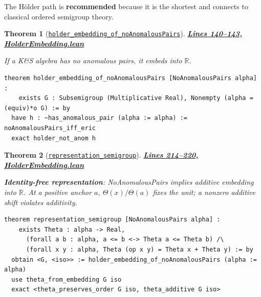 \documentclass[11pt]{article}
\newtheorem{theorem}{Theorem}[section]
\theoremstyle{definition}
\theoremstyle{remark}
\begin{document}
The Hölder path is \textbf{recommended} because it is the shortest and connects to classical
ordered semigroup theory.

\begin{theorem}[\href{https://github.com/zariuq/ks-foundations-of-inference/blob/main/KnuthSkilling/Additive/Proofs/OrderedSemigroupEmbedding/HolderEmbedding.lean\#L140}{\texttt{holder\_embedding\_of\_noAnomalousPairs}}]
\textbf{\href{https://github.com/zariuq/ks-foundations-of-inference/blob/main/KnuthSkilling/Additive/Proofs/OrderedSemigroupEmbedding/HolderEmbedding.lean\#L140-L143}{Lines 140--143, HolderEmbedding.lean}}

If a K\&S algebra has no anomalous pairs, it embeds into $\mathbb{R}$.
\end{theorem}

\begin{lstlisting}[caption={Hölder embedding theorem}]
theorem holder_embedding_of_noAnomalousPairs [NoAnomalousPairs alpha] :
    exists G : Subsemigroup (Multiplicative Real), Nonempty (alpha =(equiv)*o G) := by
  have h : ~has_anomalous_pair (alpha := alpha) := noAnomalousPairs_iff_eric
  exact holder_not_anom h
\end{lstlisting}

\begin{theorem}[\href{https://github.com/zariuq/ks-foundations-of-inference/blob/main/KnuthSkilling/Additive/Proofs/OrderedSemigroupEmbedding/HolderEmbedding.lean\#L214}{\texttt{representation\_semigroup}}]
\textbf{\href{https://github.com/zariuq/ks-foundations-of-inference/blob/main/KnuthSkilling/Additive/Proofs/OrderedSemigroupEmbedding/HolderEmbedding.lean\#L214-L220}{Lines 214--220, HolderEmbedding.lean}}

\textbf{Identity-free representation}: NoAnomalousPairs implies additive embedding into $\mathbb{R}$.
At a positive anchor $a$, $\Theta(x)/\Theta(a)$ fixes the unit; a nonzero additive shift violates additivity.
\end{theorem}

\begin{lstlisting}[caption={Identity-free representation theorem}]
theorem representation_semigroup [NoAnomalousPairs alpha] :
    exists Theta : alpha -> Real,
      (forall a b : alpha, a <= b <-> Theta a <= Theta b) /\
      (forall x y : alpha, Theta (op x y) = Theta x + Theta y) := by
  obtain <G, <iso>> := holder_embedding_of_noAnomalousPairs (alpha := alpha)
  use theta_from_embedding G iso
  exact <theta_preserves_order G iso, theta_additive G iso>
\end{lstlisting}
\end{document}
